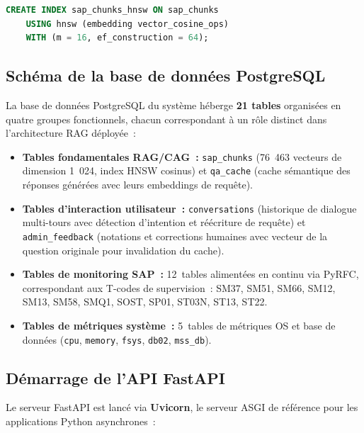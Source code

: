 \begin{lstlisting}[language=SQL, caption={Création de l'index vectoriel HNSW sur la table sap\_chunks}]
CREATE INDEX sap_chunks_hnsw ON sap_chunks
    USING hnsw (embedding vector_cosine_ops)
    WITH (m = 16, ef_construction = 64);
\end{lstlisting}

\subsection{Schéma de la base de données PostgreSQL}
\label{subsec:schema_bdd}

La base de données PostgreSQL du système héberge \textbf{21 tables} organisées en quatre
groupes fonctionnels, chacun correspondant à un rôle distinct dans l'architecture RAG déployée~:

\begin{itemize}[leftmargin=2em]
  \item \textbf{Tables fondamentales RAG/CAG~:} \texttt{sap\_chunks} (76~463 vecteurs de
        dimension 1~024, index HNSW cosinus) et \texttt{qa\_cache} (cache sémantique des
        réponses générées avec leurs embeddings de requête).
  \item \textbf{Tables d'interaction utilisateur~:} \texttt{conversations} (historique de
        dialogue multi-tours avec détection d'intention et réécriture de requête) et
        \texttt{admin\_feedback} (notations et corrections humaines avec vecteur de la
        question originale pour invalidation du cache).
  \item \textbf{Tables de monitoring SAP~:} 12~tables alimentées en continu via PyRFC,
        correspondant aux T-codes de supervision~: SM37, SM51, SM66, SM12, SM13, SM58,
        SMQ1, SOST, SP01, ST03N, ST13, ST22.
  \item \textbf{Tables de métriques système~:} 5~tables de métriques OS et base de données
        (\texttt{cpu}, \texttt{memory}, \texttt{fsys}, \texttt{db02}, \texttt{mss\_db}).
\end{itemize}



\subsection{Démarrage de l'API FastAPI}

Le serveur FastAPI est lancé via \textbf{Uvicorn}, le serveur ASGI de référence pour les applications Python asynchrones~:


